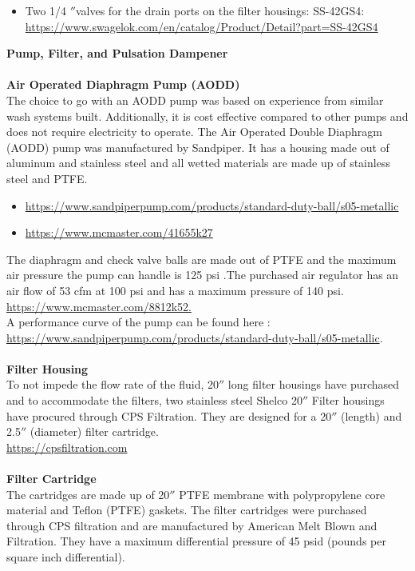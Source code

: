 \begin{itemize}
\item Two 1/4 $''$valves for the drain ports on the filter housings: SS-42GS4: \url{https://www.swagelok.com/en/catalog/Product/Detail?part=SS-42GS4}\\
\end{itemize} 
\textbf{Pump, Filter, and Pulsation Dampener}\\
\\
\textbf{Air Operated Diaphragm Pump (AODD)}\\
The choice to go with an AODD pump was based on experience from similar wash systems built. Additionally, it is cost effective compared to other pumps and does not require electricity to operate. The Air Operated Double Diaphragm (AODD) pump was manufactured by Sandpiper. It has a housing made out of aluminum and stainless steel and all wetted materials are made up of stainless steel and PTFE. \\
\begin{itemize}
\item \url{https://www.sandpiperpump.com/products/standard-duty-ball/s05-metallic}
\item \url{https://www.mcmaster.com/41655k27}\\
\end{itemize}
The diaphragm and check valve balls are made out of PTFE and the maximum air pressure the pump can handle is 125 psi .The purchased air regulator has an air flow of 53 cfm at 100 psi and has a maximum pressure of 140 psi.\\
\url{ https://www.mcmaster.com/8812k52.}\\
A performance curve of the pump can be found here : \url{https://www.sandpiperpump.com/products/standard-duty-ball/s05-metallic}.\\
 \\
 \textbf{Filter Housing}\\
To not impede the flow rate of the fluid, 20$''$ long filter housings have purchased and to accommodate the filters, two stainless steel Shelco 20$''$  Filter housings have procured through CPS Filtration. They are designed for a 20$''$ (length) and 2.5$''$  (diameter) filter cartridge.\\
\url{ https://cpsfiltration.com}\\
\\
\textbf{Filter Cartridge}\\
The cartridges are made up of 20$''$ PTFE membrane with polypropylene core material and Teflon (PTFE) gaskets.  The filter cartridges were purchased through CPS filtration and  are manufactured by American Melt Blown and Filtration. They have a maximum differential pressure of 45 psid (pounds per square inch differential).\\
